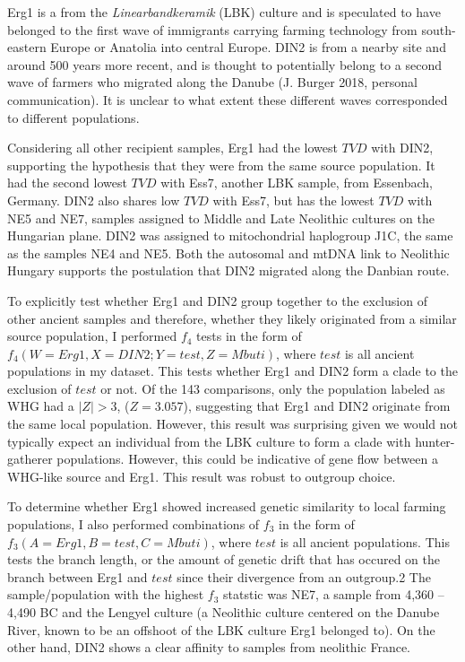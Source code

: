 Erg1 is a from the \textit{Linearbandkeramik} (LBK) culture and is speculated to have belonged to the first wave of immigrants carrying farming technology from south-eastern Europe or Anatolia into central Europe. DIN2 is from a nearby site and around 500 years more recent, and is thought to potentially belong to a second wave of farmers who migrated along the Danube (J. Burger 2018, personal communication). It is unclear to what extent these different waves corresponded to different populations.  

Considering all other recipient samples, Erg1 had the lowest $TVD$ with DIN2, supporting the hypothesis that they were from the same source population. It had the second lowest $TVD$ with Ess7, another LBK sample, from Essenbach, Germany. DIN2 also shares low $TVD$ with Ess7, but has the lowest $TVD$ with NE5 and NE7, samples assigned to Middle and Late Neolithic cultures on the Hungarian plane. DIN2 was assigned to mitochondrial haplogroup J1C, the same as the samples NE4 and NE5. Both the autosomal and mtDNA link to Neolithic Hungary supports the postulation that DIN2 migrated along the Danbian route.   

To explicitly test whether Erg1 and DIN2 group together to the exclusion of other ancient samples and therefore, whether they likely originated from a similar source population, I performed $f_{4}$ tests in the form of $f_{4}(W=Erg1, X=DIN2; Y=test, Z=Mbuti)$, where $test$ is all ancient populations in my dataset. This tests whether Erg1 and DIN2 form a clade to the exclusion of $test$ or not. Of the 143 comparisons, only the population labeled as WHG had a $|Z|>3$, ($Z=3.057$), suggesting that Erg1 and DIN2 originate from the same local population. However, this result was surprising given we would not typically expect an individual from the LBK culture to form a clade with hunter-gatherer populations. However, this could be indicative of gene flow between a WHG-like source and Erg1. This result was robust to outgroup choice.  

To determine whether Erg1 showed increased genetic similarity to local farming populations, I also performed combinations of $f_{3}$ in the form of $f_{3}(A=Erg1, B=test, C=Mbuti)$, where $test$ is all ancient populations. This tests the branch length, or the amount of genetic drift that has occured on the branch between Erg1 and $test$ since their divergence from an outgroup.2 The sample/population with the highest $f_{3}$ statstic was NE7, a sample from 4,360 – 4,490 BC and the Lengyel culture (a Neolithic culture centered on the Danube River, known to be an offshoot of the LBK culture Erg1 belonged to). On the other hand, DIN2 shows a clear affinity to samples from neolithic France.

